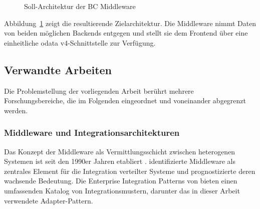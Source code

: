 \begin{figure}[H]
\centering
{}
\caption{Soll-Architektur der BC Middleware}
\label{fig:soll-architektur}
\end{figure}

Abbildung~\ref{fig:soll-architektur} zeigt die resultierende Zielarchitektur. Die Middleware nimmt Daten von beiden möglichen Backends entgegen und stellt sie dem Frontend über eine einheitliche \gls{odata} v4-Schnittstelle zur Verfügung.

\subsection{Verwandte Arbeiten}

Die Problemstellung der vorliegenden Arbeit berührt mehrere Forschungsbereiche, die im Folgenden eingeordnet und voneinander abgegrenzt werden.

\subsubsection{Middleware und Integrationsarchitekturen}

Das Konzept der Middleware als Vermittlungsschicht zwischen heterogenen Systemen ist seit den 1990er Jahren etabliert \citep{bernstein1996}. \cite{emmerich2000} identifizierte Middleware als zentrales Element für die Integration verteilter Systeme und prognostizierte deren wachsende Bedeutung. Die Enterprise Integration Patterns von \cite{hohpe2003} bieten einen umfassenden Katalog von Integrationsmustern, darunter das in dieser Arbeit verwendete Adapter-Pattern.

